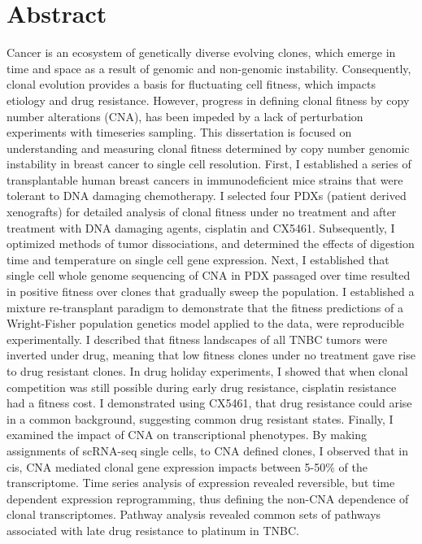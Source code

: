 
\chapter{Abstract}

Cancer is an ecosystem of genetically diverse evolving clones, which emerge in time and space as a result of genomic and non-genomic instability. Consequently, clonal evolution provides a basis for fluctuating cell fitness, which impacts etiology and drug resistance. However, progress in defining clonal fitness by copy number alterations (CNA), has been impeded by a lack of perturbation experiments with timeseries sampling. This dissertation is focused on understanding and measuring clonal fitness determined by copy number genomic instability in breast cancer to single cell resolution. First, I established a series of transplantable human breast cancers in immunodeficient mice strains that were tolerant to DNA damaging chemotherapy. I selected four PDXs (patient derived xenografts) for detailed analysis of clonal fitness under no treatment and after treatment with DNA damaging agents, cisplatin and CX5461. Subsequently, I optimized methods of tumor dissociations, and determined the effects of digestion time and temperature on single cell gene expression. Next, I established that single cell whole genome sequencing of CNA in PDX passaged over time resulted in positive fitness over clones that gradually sweep the population. I established a mixture re-transplant paradigm to demonstrate that the fitness predictions of a Wright-Fisher population genetics model applied to the data, were reproducible experimentally.  I described that fitness landscapes of all TNBC tumors were inverted under drug, meaning that low fitness clones under no treatment gave rise to drug resistant clones. In drug holiday experiments, I showed that when clonal competition was still possible during early drug resistance, cisplatin resistance had a fitness cost. I demonstrated using CX5461, that drug resistance could arise in a common background, suggesting common drug resistant states. Finally, I examined the impact of CNA on transcriptional phenotypes. By making assignments of scRNA-seq single cells, to CNA defined clones, I observed that in cis, CNA mediated clonal gene expression impacts between 5-50\% of the transcriptome. Time series analysis of expression revealed reversible, but time dependent expression reprogramming, thus defining the non-CNA dependence of clonal transcriptomes. Pathway analysis revealed common sets of pathways associated with late drug resistance to platinum in TNBC.

